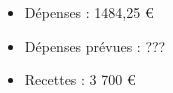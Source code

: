 \begin{frame}
   \begin{itemize}
      \item Dépenses : 1484,25 €
      \item Dépenses prévues : ???
      \item Recettes : 3 700 €
   \end{itemize}
\end{frame}
